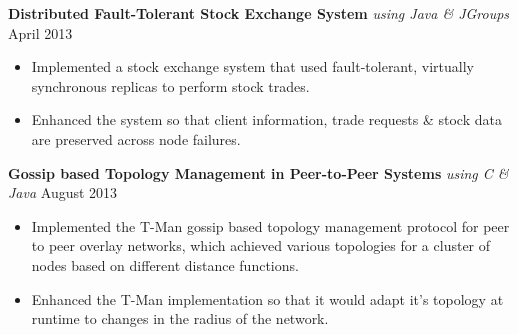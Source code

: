 \documentclass[10pt]{article}
\begin{document}
\textbf{Distributed Fault-Tolerant Stock Exchange System} \textit{using Java \& JGroups} \hfill April 2013
\begin{itemize}
    \item Implemented a stock exchange system that used fault-tolerant, virtually synchronous replicas to perform stock trades.
    \item Enhanced the system so that client information, trade requests \& stock data are preserved across node failures. %
\end{itemize}
\textbf{Gossip based Topology Management in Peer-to-Peer Systems} \textit{using C \& Java} \hfill August 2013
\begin{itemize}
    \item Implemented the T-Man gossip based topology management protocol for peer to peer overlay networks, which achieved various topologies for a cluster of nodes based on different distance functions.
    \item Enhanced the T-Man implementation so that it would adapt it's topology at runtime to changes in the radius of the network. %
\end{itemize}

\end{document}
